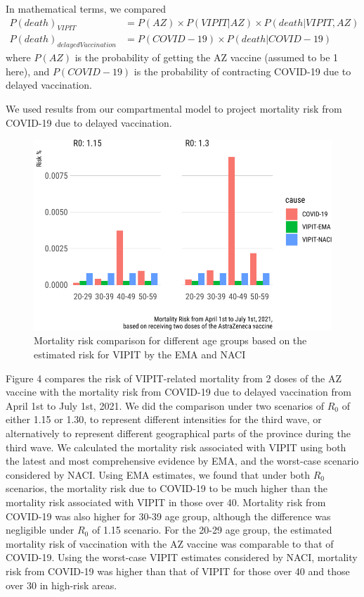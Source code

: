 \documentclass[]{interact}
\theoremstyle{plain}%
\theoremstyle{definition}
\theoremstyle{remark}
\begin{document}
In mathematical terms, we compared \[
\begin{aligned}
P(death)_{VIPIT}  &= P(AZ) \times P(VIPIT|AZ) \times P(death|VIPIT, AZ) \\
P(death)_{delayedVaccination} &= P(COVID-19) \times P(death|COVID-19)
\end{aligned}
\] where \(P(AZ)\) is the probability of getting the AZ vaccine (assumed
to be 1 here), and \(P(COVID-19)\) is the probability of contracting
COVID-19 due to delayed vaccination.

We used results from our compartmental model to project mortality risk
from COVID-19 due to delayed vaccination.

\begin{figure}

{\centering \includegraphics[width=0.7\linewidth]{theCaseforAZ_files/figure-latex/covidvsvipit-1} 

}

\caption{Mortality risk comparison for different age groups based on the estimated risk for VIPIT by the EMA and NACI}\label{fig:covidvsvipit}
\end{figure}

Figure 4 compares the risk of VIPIT-related mortality from 2 doses of
the AZ vaccine with the mortality risk from COVID-19 due to delayed
vaccination from April 1st to July 1st, 2021. We did the comparison
under two scenarios of \(R_0\) of either 1.15 or 1.30, to represent
different intensities for the third wave, or alternatively to represent
different geographical parts of the province during the third wave. We
calculated the mortality risk associated with VIPIT using both the
latest and most comprehensive evidence by EMA, and the worst-case
scenario considered by NACI. Using EMA estimates, we found that under
both \(R_0\) scenarios, the mortality risk due to COVID-19 to be much
higher than the mortality risk associated with VIPIT in those over 40.
Mortality risk from COVID-19 was also higher for 30-39 age group,
although the difference was negligible under \(R_0\) of 1.15 scenario.
For the 20-29 age group, the estimated mortality risk of vaccination
with the AZ vaccine was comparable to that of COVID-19. Using the
worst-case VIPIT estimates considered by NACI, mortality risk from
COVID-19 was higher than that of VIPIT for those over 40 and those over
30 in high-risk areas.
\end{document}
